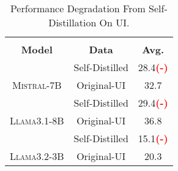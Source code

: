 \begin{table}[h]
\small
\centering
\begin{tabular}{ccc}
\hline
                                       &                                        &                              \\
\multirow{-2}{*}{\textbf{Model}} & \multirow{-2}{*}{\textbf{Data}} & \multirow{-2}{*}{\textbf{Avg.}} \\ \hline
                                       & \cellcolor[HTML]{F8E8E7}Self-Distilled & \cellcolor[HTML]{F8E8E7}28.4\textcolor{red}{\textbf{(-)} } \\
\multirow{-2}{*}{\textsc{Mistral-7B}}  & Original-UI                            & 32.7                         \\ \hline
                                       & \cellcolor[HTML]{F8E8E7}Self-Distilled & \cellcolor[HTML]{F8E8E7}29.4\textcolor{red}{\textbf{(-)} } \\
\multirow{-2}{*}{\textsc{Llama3.1-8B}} & Original-UI                            & 36.8                         \\ \hline
                                       & \cellcolor[HTML]{F8E8E7}Self-Distilled & \cellcolor[HTML]{F8E8E7}15.1\textcolor{red}{\textbf{(-)} } \\
\multirow{-2}{*}{\textsc{Llama3.2-3B}} & Original-UI                            & 20.3                         \\ \hline
\end{tabular}

\caption{Performance Degradation From Self-Distillation On UI.}\
\label{tab:self_distill_ultra}
\end{table}